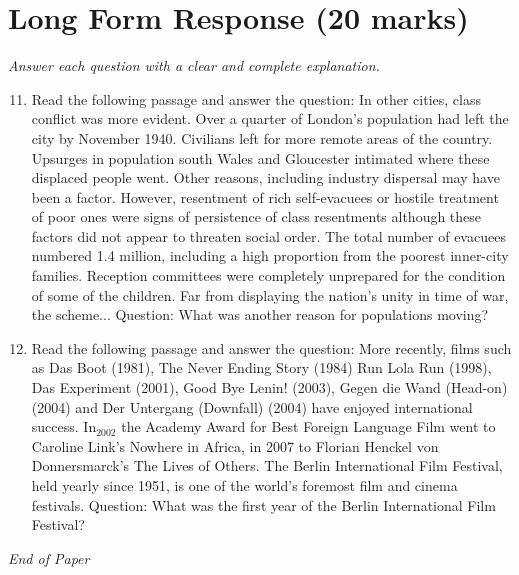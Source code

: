 \documentclass[12pt]{article}
\begin{document}
\section*{Long Form Response (20 marks)}
\textit{Answer each question with a clear and complete explanation.}
\begin{enumerate}[label=\arabic*.]
\setcounter{enumi}{10}
\item Read the following passage and answer the question: In other cities, class conflict was more evident. Over a quarter of London's population had left the city by November 1940. Civilians left for more remote areas of the country. Upsurges in population south Wales and Gloucester intimated where these displaced people went. Other reasons, including industry dispersal may have been a factor. However, resentment of rich self-evacuees or hostile treatment of poor ones were signs of persistence of class resentments although these factors did not appear to threaten social order. The total number of evacuees numbered 1.4 million, including a high proportion from the poorest inner-city families. Reception committees were completely unprepared for the condition of some of the children. Far from displaying the nation's unity in time of war, the scheme... Question: What was another reason for populations moving?
\item Read the following passage and answer the question: More recently, films such as Das Boot (1981), The Never Ending Story (1984) Run Lola Run (1998), Das Experiment (2001), Good Bye Lenin! (2003), Gegen die Wand (Head-on) (2004) and Der Untergang (Downfall) (2004) have enjoyed international success. In$_{2002}$ the Academy Award for Best Foreign Language Film went to Caroline Link's Nowhere in Africa, in 2007 to Florian Henckel von Donnersmarck's The Lives of Others. The Berlin International Film Festival, held yearly since 1951, is one of the world's foremost film and cinema festivals. Question: What was the first year of the Berlin International Film Festival?
\end{enumerate}

\vfill
\noindent\textit{End of Paper}
\end{document}
